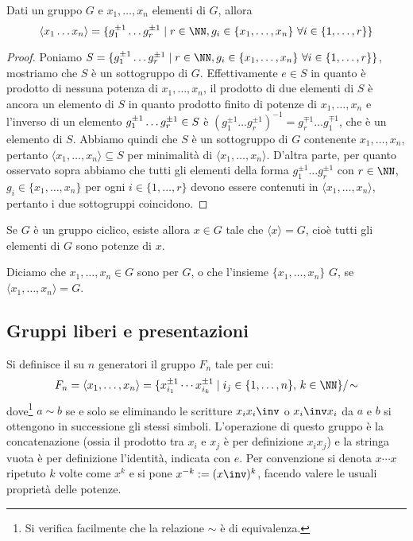 \documentclass[11pt]{scrartcl}
\begin{document}
	\begin{proposition}
		Dati un gruppo $G$ e $x_1, \ldots, x_n$ elementi di $G$, allora \[
		\langle x_1 \ldots x_n\rangle = \{g_1^{\pm 1} \ldots g_r^{\pm 1}\mid r 
		\in \NN, g_i \in \{x_1, \ldots, x_n\}~\forall i \in \{1, \ldots, r\}\}
		\]
	\end{proposition}
	
	\begin{proof}
		Poniamo $S = \{g_1^{\pm 1} \ldots g_r^{\pm 1}\mid r \in \NN, g_i \in \{x_1, \ldots, x_n\}
		~\forall i \in \{1, \ldots, r\}\}$, mostriamo che $S$ è un sottogruppo di $G$. 
		Effettivamente $e \in S$ in quanto è prodotto di nessuna potenza di $x_1, \ldots, x_n$, 
		il prodotto di due elementi di $S$ è ancora un elemento di $S$ in quanto
		prodotto finito di potenze di $x_1, \ldots, x_n$ e l'inverso di un elemento
		$g_1^{\pm 1}\ldots g_r^{\pm 1} \in\nolinebreak S$ è $(g_1^{\pm 1}\ldots 
		g_r^{\pm 1})^{-1} = g_r^{\mp 1}\ldots g_1^{\mp 1}$, che è un elemento di $S$.
		Abbiamo quindi che $S$ è un sottogruppo di $G$ contenente $x_1, \ldots, x_n$,
		pertanto $\langle x_1, \ldots, x_n\rangle\subseteq S$ per minimalità di $\langle x_1,
		\ldots, x_n\rangle$. D'altra parte, per quanto osservato sopra abbiamo che
		tutti gli elementi della forma $g_1^{\pm 1}\ldots g_r^{\pm 1}$ con $r \in \NN$, 
		$g_i \in \{x_1, \ldots, x_n\}$ per ogni $i \in \{1, \ldots, r\}$ devono essere
		contenuti in $\langle x_1, \ldots, x_n\rangle$, pertanto i due sottogruppi
		coincidono.
	\end{proof}
	
	\begin{remark}
		Se $G$ è un gruppo ciclico, esiste allora $x \in G$ tale che 
		$\langle x\rangle = G$, cioè tutti gli elementi di $G$ sono potenze di $x$.
	\end{remark}
	
	Diciamo che $x_1, \ldots, x_n \in G$ sono  per $G$, o che 
	l'insieme $\{x_1, \ldots, x_n\}$  $G$, se $\langle x_1, \ldots, x_n\rangle = G$.
	
	\newpage
	\subsection{Gruppi liberi e presentazioni}
	
	\begin{definition}
		Si definisce il  su $n$ generatori
		il gruppo $F_n$ tale per cui:
		\[ F_n = \langle{x_1, \ldots, x_n\rangle} = \{ x_{i_1}^{\pm 1} \cdots x_{i_k}^{\pm 1} \mid i_j \in \{1, \ldots, n\}, \, k \in \NN \} / \! \sim \]
		dove\footnote{
			Si verifica facilmente che la relazione $\sim$ è di equivalenza.
		} $a \sim b$ se e solo se eliminando le scritture $x_i x_i\inv$ 
		o $x_i\inv x_i$ da $a$ e $b$ si ottengono in successione gli stessi simboli.
		L'operazione di
		questo gruppo è la concatenazione (ossia il prodotto tra
		$x_i$ e $x_j$ è per definizione $x_i x_j$) e la stringa
		vuota è per definizione l'identità, indicata con $e$.
		Per convenzione si denota $x \cdots x$ ripetuto $k$ volte come $x^k$ e si pone $x^{-k} := (x\inv)^k$, facendo
		valere le usuali proprietà delle potenze.
	\end{definition}
	
\end{document}
